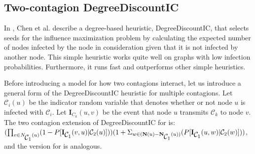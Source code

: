 \documentclass[11pt]{article}
\begin{document}
\subsection{Two-contagion DegreeDiscountIC}
In \cite{DegreeDiscount}, Chen et al. describe a degree-based heuristic, DegreeDiscountIC, that selects seeds for the influence maximization problem by calculating the expected number of nodes infected by the node in consideration given that it is not infected by another node. This simple heuristic works quite well on graphs with low infection probabilities. Furthermore, it runs fast and outperforms other simple heuristics.

Before introducing a model for how two contagions interact, let us introduce a general form of the DegreeDiscountIC heuristic for multiple contagions. Let $\mathcal{C}_{i}(u)$ be the indicator random variable that denotes whether or not node $u$ is infected with $\mathcal{C}_{i}$. Let $\mathbf{I}_{C_{k}}(u,v)$ be the event that node $u$ transmits $\mathcal{C}_k$ to node $v$. The two contagion extension of DegreeDiscountIC for \cone{} is: $(\prod_{v\in \mathbf{}{N}_{\mbox{$\mathcal{C}_1$}{}}(u)}(1-P[\mathbf{I}_{\mbox{$\mathcal{C}_1$}}(v,u)|\mbox{$\mathcal{C}_2$}(u) ]))(1+\Sigma_{w \in  (\mathbf{N}(u)-  \mathbf{N}_{\mbox{$\mathcal{C}_1$}{}}(u))}(P[\mathbf{I}_{\mbox{$\mathcal{C}_1$}}(u,w)|\mbox{$\mathcal{C}_2$}(w)]))$, and the version for \ctwo{} is analogous.
    
\end{document}
